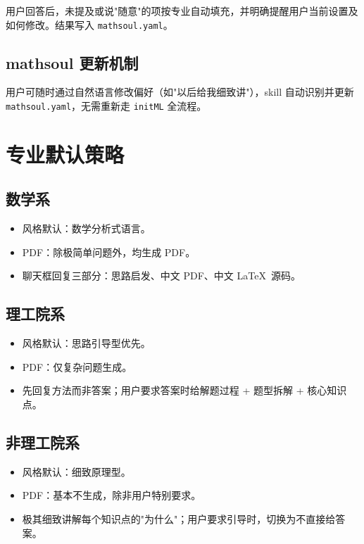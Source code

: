 \documentclass[12pt,a4paper]{ctexart}
\begin{document}
用户回答后，未提及或说"随意"的项按专业自动填充，并明确提醒用户当前设置及如何修改。结果写入 \texttt{mathsoul.yaml}。

\subsection{mathsoul 更新机制}

用户可随时通过自然语言修改偏好（如"以后给我细致讲"），skill 自动识别并更新 \texttt{mathsoul.yaml}，无需重新走 \texttt{initML} 全流程。

\section{专业默认策略}

\subsection{数学系}
\begin{itemize}
  \item 风格默认：数学分析式语言。
  \item PDF：除极简单问题外，均生成 PDF。
  \item 聊天框回复三部分：思路启发、中文 PDF、中文 \LaTeX\ 源码。
\end{itemize}

\subsection{理工院系}
\begin{itemize}
  \item 风格默认：思路引导型优先。
  \item PDF：仅复杂问题生成。
  \item 先回复方法而非答案；用户要求答案时给解题过程 + 题型拆解 + 核心知识点。
\end{itemize}

\subsection{非理工院系}
\begin{itemize}
  \item 风格默认：细致原理型。
  \item PDF：基本不生成，除非用户特别要求。
  \item 极其细致讲解每个知识点的"为什么"；用户要求引导时，切换为不直接给答案。
\end{itemize}
\end{document}
